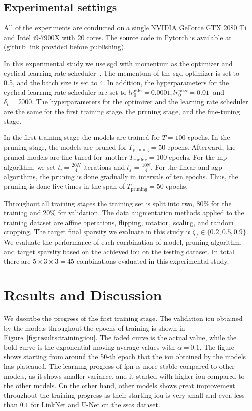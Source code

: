 \documentclass[mathematics,article,submit,pdftex,moreauthors]{Definitions/mdpi}
\begin{document}
\subsection{Experimental settings}
All of the experiments are conducted on a 
single NVIDIA GeForce GTX 2080 Ti and
Intel i9-7900X with 20 cores. The source code in Pytorch is 
available at (github link provided before publishing).

In this experimental study we use \ac{sgd} with
momentum as the optimizer and cyclical learning
rate scheduler~\cite{Smith2017}.
The momentum of the \ac{sgd} optimizer is set to 0.5,
and the batch size is set to 4.
In addition, the hyperparameters for the cyclical learning
rate scheduler are set to $lr^{\min}_0=0.0001, lr^{\max}_0=0.01$, 
and $\delta_t=2000$. The hyperparameters for the optimizer and 
the learning rate scheduler are the same for the first
training stage, the pruning stage, and the fine-tuning stage.

In the first training stage the models
are trained for $T=100$ epochs. In the pruning stage,
the models are pruned for $T_{\text{pruning}}=50$ epochs.
Afterward, the pruned models are fine-tuned for another 
$T_{\text{tuning}}=100$ epochs. For the \ac{mp} algorithm,
we set $t_i=\frac{20N}{4}$ iterations and $t_f=\frac{10N}{4}$.
For the linear and \ac{agp} algorithms, the pruning
is done gradually in intervals of ten epochs. Thus, the pruning
is done five times in the span of $T_{\text{pruning}}=50$ epochs.

Throughout all training stages
the training set is split into two, $80\%$ for the 
training and $20\%$ for validation. The data augmentation
methods applied to the training dataset are affine operations,
flipping, rotation, scaling, and random cropping.
The target final sparsity we evaluate in this study
is $\zeta_f \in \{0.2, 0.5, 0.9\}$. We evaluate the performance
of each combination of model, pruning algorithm, and
target sparsity based on the achieved \ac{iou} on
the testing dataset. In total there are $5\times 3\times 3=45$
combinations evaluated in this experimental study.

\section {Results and Discussion}
We describe the progress of the first
training stage. The validation \ac{iou}
obtained by the models throughout the epochs
of training is shown in 
Figure~\ref{fig:results:training:iou}.
The faded curve is the actual value, while the 
bold curve is the exponential moving average
values with $\alpha=0.1$. The figure shows 
starting from around the 50-th epoch that the \ac{iou}
obtained by the models has plateaued.
The learning progress of \ac{fpn} is more stable
compared to other models, as it shows smaller variance,
and it started with higher \ac{iou} compared to the other models.
On the other hand, other models shows great improvement
throughout the training progress as their starting \ac{iou}
is very small and even less than $0.1$ for LinkNet and U-Net
on the \ac{sscs} dataset.
\end{document}
